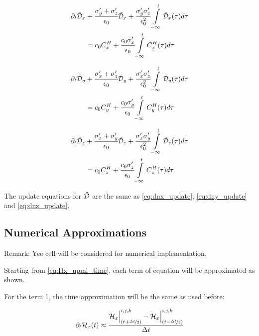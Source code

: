 \begin{align}
    \partial_t\tilde{\mathcal{D}}_x
    &+
    \cfrac{\sigma_y^{\prime} + \sigma_z^{\prime}}{\epsilon_0}\tilde{\mathcal{D}}_x
    +
    \cfrac{\sigma_y^{\prime} \sigma_z^{\prime}}{\epsilon_0^2} \int\limits_{-\infty}^t\tilde{\mathcal{D}}_x(\tau)d\tau 
    \nonumber \\
    &=
    c_0C_x^H
    +
    \cfrac{c_0\sigma_x^{\prime}}{\epsilon_0}\int\limits_{-\infty}^tC_x^H(\tau)d\tau
    \label{eq:Dx_upml_time}
\end{align}

\begin{align}
    \partial_t\tilde{\mathcal{D}}_y
    &+
    \cfrac{\sigma_x^{\prime} + \sigma_z^{\prime}}{\epsilon_0}\tilde{\mathcal{D}}_y
    +
    \cfrac{\sigma_x^{\prime} \sigma_z^{\prime}}{\epsilon_0^2} \int\limits_{-\infty}^t\tilde{\mathcal{D}}_y(\tau)d\tau 
    \nonumber \\
    &=
    c_0C_y^H
    +
    \cfrac{c_0\sigma_y^{\prime}}{\epsilon_0}\int\limits_{-\infty}^tC_y^H(\tau)d\tau
    \label{eq:Dy_upml_time}
\end{align}

\begin{align}
    \partial_t\tilde{\mathcal{D}}_z
    &+
    \cfrac{\sigma_x^{\prime} + \sigma_y^{\prime}}{\epsilon_0}\tilde{\mathcal{D}}_z
    +
    \cfrac{\sigma_x^{\prime} \sigma_y^{\prime}}{\epsilon_0^2} \int\limits_{-\infty}^t\tilde{\mathcal{D}}_z(\tau)d\tau 
    \nonumber \\
    &=
    c_0C_z^H
    +
    \cfrac{c_0\sigma_z^{\prime}}{\epsilon_0}\int\limits_{-\infty}^tC_z^H(\tau)d\tau
    \label{eq:Dz_upml_time}
\end{align}

The update equations for $\tilde{\mathcal{D}}$ are the same as \eqref{eq:dnx_update}, \eqref{eq:dny_update} and \eqref{eq:dnz_update}.

\subsection{Numerical Approximations}

Remark: Yee cell will be considered for numerical implementation.

Starting from \eqref{eq:Hx_upml_time}, each term of equation will be approximated as shown.

For the term 1, the time approximation will be the same as used before:

\begin{align}
    \partial_t\mathcal{H}_x(t) \approx \cfrac{\mathcal{H}_x\Big|_{(t+\nicefrac{\Delta t}{2})}^{i,j,k}-\mathcal{H}_x\Big|^{i,j,k}_{(t-\nicefrac{\Delta t}{2})}}{\Delta t}
\end{align}

